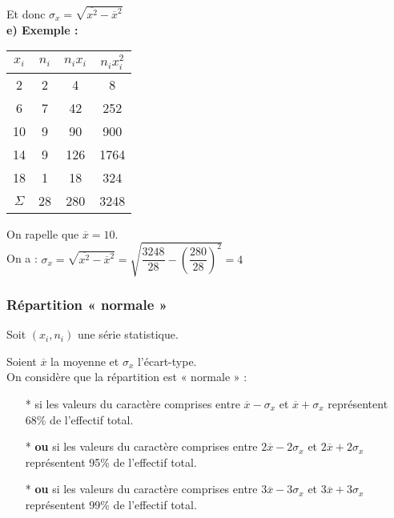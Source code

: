 Et donc $ \sigma_x = \sqrt{\overline{x^2} - \overline{x}^2} $ \\

\textbf{e) Exemple :} \\

\begin{tabular}{c|c|c|c}
$x_i$ & $n_i$ & $n_ix_i$ & $n_ix_i^2$ \\
\hline
2 & 2 & 4 & 8 	\\
6 & 7 & 42 & 252 \\
10 & 9 & 90 & 900 \\
14 & 9 & 126 & 1764 \\
18 & 1 & 18 & 324 \\
\hline
$\Sigma$ & 28 & 280 & 3248 \\
\end{tabular}

\vspace{.3cm
}
On rapelle que $\overline{x} = 10 $. \\

On a : $ \sigma_x = \sqrt{\overline{x^2} - \overline{x}^2} = \sqrt{\dfrac{3248}{28} - \left(\dfrac{280}{28}\right)^2} = 4 $ \\


\newpage

\subsubsection{Répartition « normale »}

Soit $\left(x_i,n_i\right)$ une série statistique. 

Soient $\overline{x}$ la moyenne et $\sigma_x$ l'écart-type. \\

On considère que la répartition est « normale » : \\

\begin{itemize}
\item[*] si les valeurs du caractère comprises entre $\overline{x} - \sigma_x$ et $\overline{x} + \sigma_x$ représentent 68\% de l'effectif total.
\item[*] \textbf{ou} si les valeurs du caractère comprises entre $2\overline{x} - 2\sigma_x$ et $2\overline{x} + 2\sigma_x$ représentent 95\% de l'effectif total.
\item[*] \textbf{ou} si les valeurs du caractère comprises entre $3\overline{x} - 3\sigma_x$ et $3\overline{x} + 3\sigma_x$ représentent 99\% de l'effectif total.
\end{itemize}

